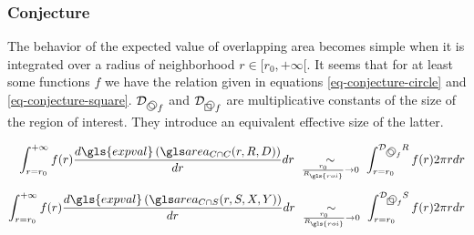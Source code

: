 \begin{appendix}

\subsubsection{Conjecture}

The behavior of the expected value of overlapping area becomes simple when it is integrated over a radius of neighborhood \( r \in [r_0, +\infty[\).
It seems that for at least some functions \( f \) we have the relation given in equations \eqref{eq-conjecture-circle} and \eqref{eq-conjecture-square}.
\( \mathcal{D}_{\symcirclecircle f} \) and \( \mathcal{D}_{\symcirclesquare f} \) are multiplicative constants of the size of the region of interest.
They introduce an equivalent effective size of the latter.

\begin{align}
  \int_{r=r_0}^{+\infty} f(r) \frac{d \gls{expval} \left( \circir (r, R, D) \right)}{dr} dr
    \ \underset{\frac{r_0}{R_{\gls{roi}}} \rightarrow 0}{\sim} \
    \int_{r=r_0}^{\mathcal{D}_{\symcirclecircle f} R} f(r) 2 \pi r dr
  \label{eq-conjecture-circle} \\[2mm]
  \int_{r=r_0}^{+\infty} f(r) \frac{d \gls{expval} \left( \cirsqr (r, S, X, Y) \right)}{dr} dr
    \ \underset{\frac{r_0}{R_{\gls{roi}}} \rightarrow 0}{\sim} \
    \int_{r=r_0}^{\mathcal{D}_{\symcirclesquare f} S} f(r) 2 \pi r dr
  \label{eq-conjecture-square}
\end{align}

\end{appendix}
